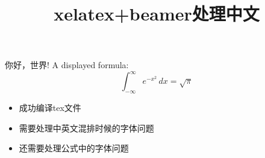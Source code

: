 \documentclass{beamer}
\begin{document}
  
\title{xelatex+beamer处理中文}   
\frame{\titlepage}  
\begin{frame} {你好，世界!}  
A displayed formula:  
\[  
  \int_{-\infty}^\infty e^{-x^2} \, dx = \sqrt{\pi}  
\]  
\begin{itemize}  
\item 成功编译tex文件  
\item 需要处理中英文混排时候的字体问题    
\item 还需要处理公式中的字体问题  
\end{itemize}  
\end{frame}  
\end{document}

